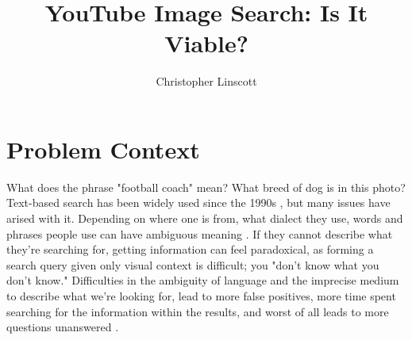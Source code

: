 \documentclass[10pt,twocolumn]{article}
\title{YouTube Image Search: Is It Viable?}
\author{Christopher Linscott}
\affiliation{Occidental College}
\begin{document}
\maketitle


\section{Problem Context}



What does the phrase "football coach" mean? What breed of dog is in this photo? Text-based search has been widely used since the 1990s \cite{}, but many issues have arised with it. Depending on where one is from, what dialect they use, words and phrases people use can have ambiguous meaning \cite{Beall2008}. If they cannot describe what they're searching for, getting information can feel paradoxical, as forming a search query given only visual context is difficult; you "don't know what you don't know." Difficulties in the ambiguity of language and the imprecise medium to describe what we're looking for, lead to more false positives, more time spent searching for the information within the results, and worst of all leads to more questions unanswered \cite{}.
\end{document}
